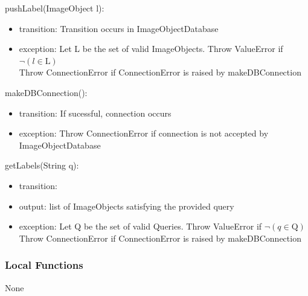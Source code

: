 \documentclass[12pt, titlepage]{article}
\begin{document}
  \noindent pushLabel(ImageObject l):
  \begin{itemize}
  \item transition: Transition occurs in ImageObjectDatabase
  \item exception: Let L be the set of valid ImageObjects. Throw ValueError if $\neg (l \in \text{L})$\\
  Throw ConnectionError if ConnectionError is raised by makeDBConnection
  \end{itemize}

  \noindent makeDBConnection():
  \begin{itemize}
  \item transition: If sucessful, connection occurs
  \item exception: Throw ConnectionError if connection is not accepted by ImageObjectDatabase
  \end{itemize}

  \noindent getLabels(String q):
  \begin{itemize}
  \item transition: 
  \item output: list of ImageObjects satisfying the provided query
  \item exception: Let Q be the set of valid Queries. Throw ValueError if $\neg (q \in \text{Q})$\\
  Throw ConnectionError if ConnectionError is raised by makeDBConnection

  \end{itemize}
  
  
  
  \subsubsection{Local Functions}

  None
  
\end{document}

